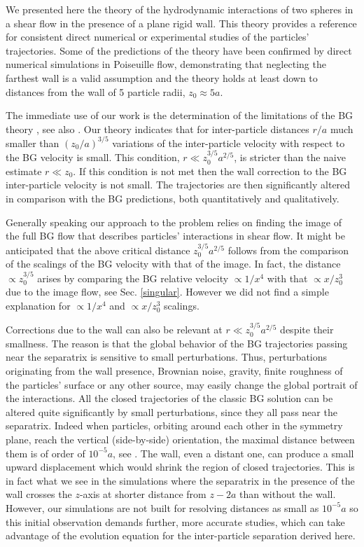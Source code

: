 We presented here the theory of the hydrodynamic interactions of two spheres in a shear flow in the presence of a plane rigid wall. This theory provides a reference for consistent direct numerical or experimental studies of the particles' trajectories. Some of the predictions of the theory have been confirmed by direct numerical simulations in Poiseuille flow, demonstrating that neglecting the farthest wall is a valid assumption and the theory holds at least down to distances from the wall of 5 particle radii, $z_0 \approx 5a$.

The immediate use of our work is the determination of the limitations of the BG theory \citep{batchelor_green_1972}, see also \cite{kim_karrila}. Our theory indicates that for inter-particle distances $r/a$ much smaller than $(z_0/a)^{3/5}$ variations of the inter-particle velocity with respect to the BG velocity is small.
This condition, $r\ll z_0^{3/5} a^{2/5}$, is stricter than the naive estimate $r \ll z_0$. If this condition is not met then the wall correction to the BG inter-particle velocity is not small. The trajectories are then significantly altered in comparison with the BG predictions, both quantitatively and qualitatively.

Generally speaking our approach to the problem relies on finding the image of the full BG flow that describes particles' interactions in shear flow. It might be anticipated that the above critical distance $z_0^{3/5} a^{2/5}$ follows from the comparison of the scalings of the BG velocity with that of the image. In fact, the distance $\propto z_0^{3/5}$ arises by comparing the BG relative velocity $\propto 1/x^4$ with that $\propto x/z_0^3$ due to the image flow, see Sec. \ref{singular}. However we did not find a simple explanation for $\propto 1/x^4$ and $\propto x/z_0^3$ scalings.

Corrections due to the wall can also be relevant at $r\ll z_0^{3/5} a^{2/5}$ despite their smallness. The reason is that the global behavior of the BG trajectories passing near the separatrix is sensitive to small perturbations. Thus, perturbations originating from the wall presence, Brownian noise, gravity, finite roughness of the particles' surface or any other source, may easily change the global portrait of the interactions. All the closed trajectories of the classic BG solution \citep{batchelor_green_1972} can be altered quite significantly by small perturbations, since they all pass near the separatrix. Indeed when particles, orbiting around each other in the symmetry plane, reach the vertical (side-by-side) orientation, the maximal distance between them is of order of $10^{-5} a$, see \cite{arp}. The wall, even a distant one, can produce a small upward displacement which would shrink the region of closed trajectories. This is in fact what we see in the simulations where the separatrix in the presence of the wall crosses the $z$-axis at shorter distance from $z-2 a$ than without the wall. However, our simulations are not built for resolving distances as small as $10^{-5} a$ so this initial observation demands further, more accurate studies, which can take advantage of the evolution equation for the inter-particle separation derived here.

